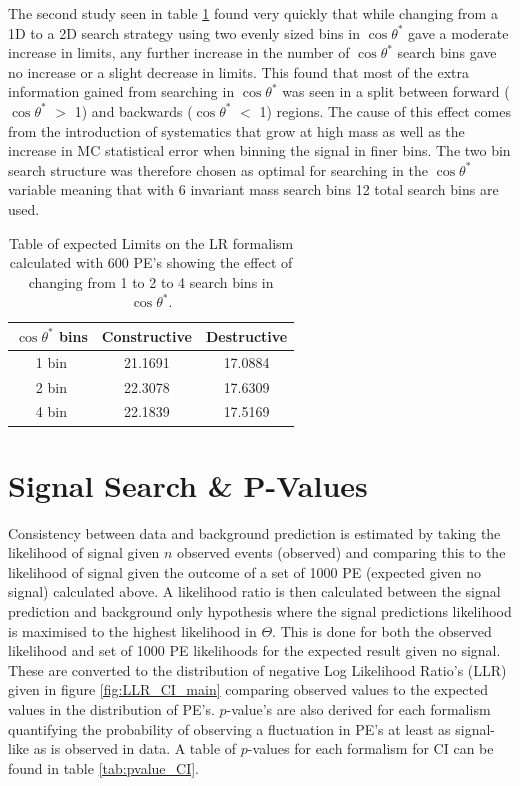    The second study seen in table \ref{tab:limits_fourbin} found very quickly that while changing from a 1D to a 2D search strategy using two evenly sized bins in $\cos{\theta^{*}}$ gave a moderate increase in limits, any further increase in the number of $\cos{\theta^{*}}$ search bins gave no increase or a slight decrease in limits. This found that most of the extra information gained from searching in $\cos{\theta^{*}}$ was seen in a split between forward ($\cos{\theta^{*}}$ $>$ 1) and backwards ($\cos{\theta^{*}}$ $<$ 1) regions. The cause of this effect comes from the introduction of systematics that grow at high mass as well as the increase in MC statistical error when binning the signal in finer bins. 
    The two bin search structure was therefore chosen as optimal for searching in the $\cos{\theta^{*}}$ variable meaning that with 6 invariant mass search bins 12 total search bins are used. 

 
    \begin {table}[h]
        \begin{center}
        \begin{tabular}{ | c | c | c | } 
            \hline
            \hline
            $\cos{\theta^{*}}$ bins & Constructive & Destructive \\
            \hline
            1 bin & 21.1691 & 17.0884 \\
            2 bin & 22.3078 & 17.6309 \\
            4 bin & 22.1839 & 17.5169 \\
            \hline
            \hline
        \end{tabular}
        \caption{Table of expected Limits on the LR formalism calculated with 600 PE's showing the effect of changing from 1 to 2 to 4 search bins in $\cos{\theta^{*}}$.}
        \label{tab:limits_fourbin}
        \end{center}
    \end {table}


\section{Signal Search \& P-Values}

    Consistency between data and background prediction is estimated by taking the likelihood of signal given $n$ observed events (observed) and comparing this to the likelihood of signal given the outcome of a set of 1000 PE (expected given no signal) calculated above. A likelihood ratio is then calculated between the signal prediction and background only hypothesis where the signal predictions likelihood is maximised to the highest likelihood in $\Theta$. This is done for both the observed likelihood and set of 1000 PE likelihoods for the expected result given no signal. These are converted to the distribution of negative Log Likelihood Ratio's (LLR) given in figure \ref{fig:LLR_CI_main} comparing observed values to the expected values in the distribution of PE's. $p$-value's are also derived for each formalism quantifying the probability of observing a fluctuation in PE's at least as signal-like as is observed in data. A table of $p$-values for each formalism for CI can be found in table \ref{tab:pvalue_CI}. 


